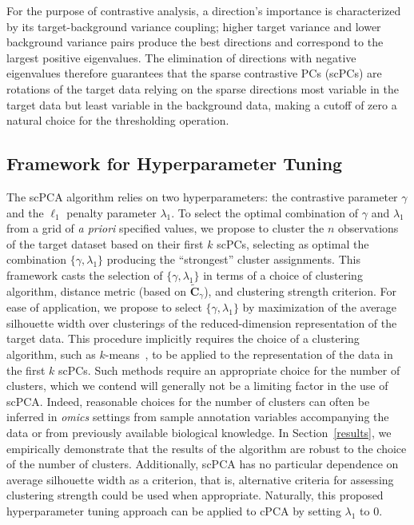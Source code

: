 For the purpose of contrastive analysis, a direction's importance is
characterized by its target-background variance coupling; higher target variance
and lower background variance pairs produce the best directions \citep{Abid2018}
and correspond to the largest positive eigenvalues. The elimination of directions with
negative eigenvalues therefore guarantees that the sparse contrastive PCs (scPCs) are
rotations of the target data relying on the sparse directions most
variable in the target data but least variable in the background data, making
a cutoff of zero a natural choice for the thresholding operation.

\subsection{Framework for Hyperparameter Tuning}\label{hyp_tune}

The scPCA algorithm relies on two hyperparameters: the contrastive parameter $\gamma$ and the $\ell_1$ penalty parameter $\lambda_1$. To select the optimal combination of $\gamma$ and $\lambda_1$ from a grid of \textit{a priori} specified values, we propose to cluster the $n$ observations of the target dataset based on their first $k$ scPCs, selecting as optimal the combination $\{\gamma, \lambda_1\}$ producing the ``strongest'' cluster assignments. This framework casts the selection of $\{\gamma, \lambda_1\}$ in terms of a choice of clustering algorithm, distance metric (based on $\widetilde{\mathbf{C}}_{\gamma}$), and clustering strength criterion. For ease of application, we propose to select $\{\gamma, \lambda_1\}$ by maximization of the average silhouette width over clusterings of the reduced-dimension representation of the target data. This procedure implicitly requires the choice of a clustering algorithm, such as $k$-means~\citep{kmeans}, to be applied to the representation of the data in the first $k$ scPCs. Such methods require an appropriate choice for the number of clusters, which we contend will generally not be a limiting factor in the use of scPCA. Indeed, reasonable choices for the number of clusters can often be inferred in \textit{omics} settings from sample annotation variables accompanying the data or from previously available biological knowledge. In Section~\ref{results}, we empirically demonstrate that the results of the algorithm are robust to the choice of the number of clusters. Additionally, scPCA has no particular dependence on average silhouette width as a criterion, that is, alternative criteria for assessing clustering strength could be used when appropriate. %
Naturally, this proposed hyperparameter tuning approach can be applied to cPCA by setting $\lambda_1$ to $0$.

